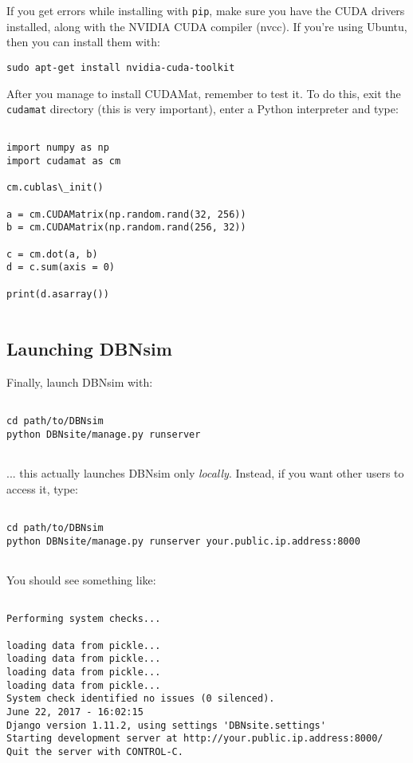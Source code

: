 \documentclass[a4paper]{article}
\begin{document}
If you get errors while installing with \texttt{pip}, make sure you have the CUDA drivers installed, along with the NVIDIA CUDA compiler (nvcc). If you're using Ubuntu, then you can install them with:
		\begin{verbatim}
sudo apt-get install nvidia-cuda-toolkit
\end{verbatim}

		
After you manage to install CUDAMat, remember to test it. To do this, exit the \texttt{cudamat} directory (this is very important), enter a Python interpreter and type:
		\begin{verbatim}

import numpy as np
import cudamat as cm

cm.cublas\_init()

a = cm.CUDAMatrix(np.random.rand(32, 256))
b = cm.CUDAMatrix(np.random.rand(256, 32))

c = cm.dot(a, b)
d = c.sum(axis = 0)

print(d.asarray())
		
\end{verbatim}


		
	\subsection{Launching DBNsim}

		
Finally, launch DBNsim with:
		\begin{verbatim}

cd path/to/DBNsim
python DBNsite/manage.py runserver
		
\end{verbatim}

		
... this actually launches DBNsim only \emph{locally}. Instead, if you want other users to access it, type:
		\begin{verbatim}

cd path/to/DBNsim
python DBNsite/manage.py runserver your.public.ip.address:8000
		
\end{verbatim}

		
You should see something like:
		\begin{verbatim}

Performing system checks...

loading data from pickle...
loading data from pickle...
loading data from pickle...
loading data from pickle...
System check identified no issues (0 silenced).
June 22, 2017 - 16:02:15
Django version 1.11.2, using settings 'DBNsite.settings'
Starting development server at http://your.public.ip.address:8000/
Quit the server with CONTROL-C.

		
\end{verbatim}
\end{document}
